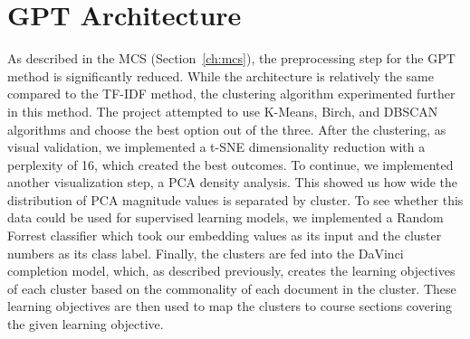\chapter{GPT Architecture}
\label{ch:gpt_arc}

As described in the MCS (Section~\ref{ch:mcs}), the preprocessing step for the GPT method is significantly reduced. While the architecture is relatively the same compared to the TF-IDF method, the clustering algorithm experimented further in this method. The project attempted to use K-Means, Birch, and DBSCAN algorithms and choose the best option out of the three. After the clustering, as visual validation, we implemented a t-SNE dimensionality reduction with a perplexity of 16, which created the best outcomes. To continue, we implemented another visualization step, a PCA density analysis. This showed us how wide the distribution of PCA magnitude values is separated by cluster. To see whether this data could be used for supervised learning models, we implemented a Random Forrest classifier which took our embedding values as its input and the cluster numbers as its class label. Finally, the clusters are fed into the DaVinci completion model, which, as described previously, creates the learning objectives of each cluster based on the commonality of each document in the cluster. These learning objectives are then used to map the clusters to course sections covering the given learning objective.